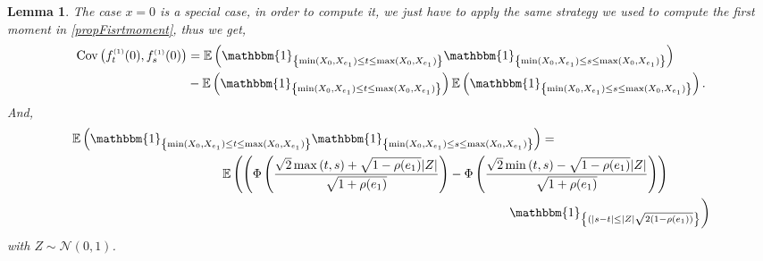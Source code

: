 \documentclass[12pt]{article}
\theoremstyle{Theorem}
\newtheorem{Lemma}[Theorem]{Lemma}
\begin{document}
\begin{Lemma}
The case $x=0$ is a special case, in order to compute it, we just have to apply the same strategy we used to compute the first moment in \ref{propFisrtmoment}, thus we get,
\begin{align*}
\text{Cov}\left(f_{t}^{\scriptscriptstyle (1)}(0), f_{s}^{\scriptscriptstyle (1)}(0)\right) & = \mathbb{E}\left(\mathbbm{1}_{\left\{\min(X_{\scriptscriptstyle 0}, X_{\scriptscriptstyle  e_1}) \leq t \leq \max(X_{\scriptscriptstyle 0}, X_{e_1})\right\}}\mathbbm{1}_{\left\{\min(X_{\scriptscriptstyle 0}, X_{ \scriptscriptstyle  e_1}) \leq s \leq \max(X_{\scriptscriptstyle 0}, X_{\scriptscriptstyle e_1}) \right\}}\right) \\
& - \mathbb{E}\left(\mathbbm{1}_{\left\{\min(X_{\scriptscriptstyle 0}, X_{e_1}) \leq t \leq \max(X_{\scriptscriptstyle 0}, X_{e_1})\right\}}\right)\mathbb{E}\left(\mathbbm{1}_{\left\{\min(X_{\scriptscriptstyle 0}, X_{e_1}) \leq s \leq \max(X_{\scriptscriptstyle 0}, X_{e_1})\right\}}\right).
\end{align*}
And, 
{\small
\begin{align*}
\mathbb{E}\left(\mathbbm{1}_{\left\{\min(X_{\scriptscriptstyle 0}, X_{\scriptscriptstyle  e_1}) \leq t \leq \max(X_{\scriptscriptstyle 0}, X_{e_1})\right\}}\mathbbm{1}_{\left\{\min(X_{\scriptscriptstyle 0}, X_{ \scriptscriptstyle  e_1}) \leq s \leq \max(X_{\scriptscriptstyle 0}, X_{\scriptscriptstyle e_1}) \right\}}\right) & = \\
& \hspace{-9cm}\mathbb{E}\left(\left(\Phi\left(\dfrac{\sqrt{2}\max\left(t,s\right) + \sqrt{1-\rho(e_1)}|Z|}{\sqrt{1+\rho(e_1)}}\right)  - \Phi\left(\dfrac{\sqrt{2}\min\left(t,s\right) - \sqrt{1-\rho(e_1)}|Z|}{\sqrt{1+\rho(e_1)}}\right)\right)\right. \\
& \hspace{-1cm} \left.\mathbbm{1}_{\left\{(|s-t| \leq |Z|\sqrt{2(1-\rho(e_1))}\right\}}\right)
\end{align*}}
with $Z \sim \mathcal{N}(0,1)$. 
\end{Lemma}
\end{document}
